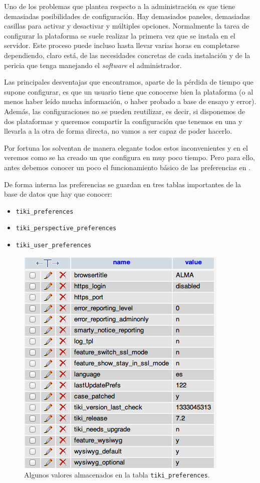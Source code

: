 Uno de los problemas que plantea \tiki{} respecto a la administración es que tiene demasiadas posibilidades de configuración. Hay demasiados paneles, demasiadas casillas para activar y desactivar y múltiples opciones. Normalmente la tarea de configurar la plataforma se suele realizar la primera vez que se instala en el servidor. Este proceso puede incluso hasta llevar varias horas en completarse dependiendo, claro está, de las necesidades concretas de cada instalación y de la pericia que tenga manejando el \textit{software} el administrador.

Las principales desventajas que encontramos, aparte de la pérdida de tiempo que supone configurar, es que un usuario tiene que conocerse bien la plataforma (o al menos haber leído mucha información, o haber probado a base de ensayo y error). Además, las configuraciones no se pueden reutilizar, es decir, si disponemos de dos plataformas y queremos compartir la configuración que tenemos en una y llevarla a la otra de forma directa, no vamos a ser capaz de poder hacerlo.

Por fortuna los \profiles{} solventan de manera elegante todos estos inconvenientes y en el  veremos como se ha creado un \profile{} que configura \alma{} en muy poco tiempo. Pero para ello, antes debemos conocer un poco el funcionamiento básico de las preferencias en \tiki{}.

De forma interna las preferencias se guardan en tres tablas importantes de la base de datos que hay que conocer:

\begin{itemize}
 \item \texttt{tiki\_preferences}
 \item \texttt{tiki\_perspective\_preferences}
 \item \texttt{tiki\_user\_preferences}
\end{itemize}

\begin{figure}
\centering
\includegraphics{../graphics/fig_valores_preferencias.png}
\caption{Algunos valores almacenados en la tabla \texttt{tiki\_preferences}.}\label{fig:valores_preferencias}
\end{figure}

